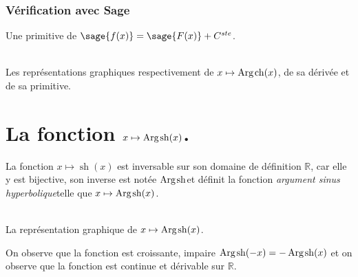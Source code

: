 \documentclass[a4paper,12pt]{report}
\def\eclaire{\mathbb}
\def\R{\ensuremath{\eclaire R}}
\renewcommand{\sinh}{\mathop{\mathrm{sh}}}
\renewcommand{\cosh}{\mathop{\mathrm{ch}}}
\renewcommand{\arg}{\mathop{\mathrm{Arg}}}
\begin{document}
\subsubsection{Vérification avec Sage}

Une primitive de $\sage{f(x)} = \sage{F(x)} + C^{ste} $.

\begin{center}
\\
Les représentations graphiques respectivement de $x \mapsto \arg\mspace{-1mu}\cosh(x)$, de sa dérivée et de sa primitive.
\end{center}





























\section{La fonction  $x \mapsto \arg\mspace{-1mu}\sinh(x)$.}

La fonction $x \mapsto \sinh(x)$ est inversable sur son domaine de définition $\R$, car elle y est bijective, son inverse est notée \og$ \arg\mspace{-1mu}\sinh $\fg et définit la fonction \og\emph{argument sinus hyperbolique}\fg telle que $x \mapsto \arg\mspace{-1mu}\sinh(x)$.


\begin{center}
 \\
La représentation graphique de $x \mapsto \arg\mspace{-1mu}\sinh(x)$.
\end{center}
On observe que la fonction est croissante, impaire $\arg\mspace{-1mu}\sinh(-x) = -\arg\mspace{-1mu}\sinh(x) $
et on observe que la fonction est continue et dérivable sur $\R$.                                                                                                             
\end{document}
